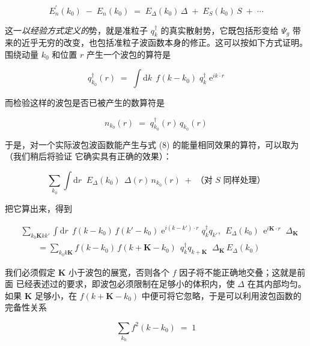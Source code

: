 \begin{equation*}
E^{\prime}_{n}(k_{0}) \;-\; E_{n}(k_{0}) \;=\; E_{\Delta}(k_{0})\,\Delta \;+\; E_{S}(k_{0})\, S \;+\; \cdots
\tag{8}
\end{equation*}

这一\emph{以经验方式定义的}势，就是准粒子 $q_{k}^{\dagger}$ 的真实散射势，它既包括形变给
$\Psi_{g}$ 带来的近乎无穷的改变，也包括准粒子波函数本身的修正。这可以按如下方式证明。
围绕动量 $k_{0}$ 和位置 $r$ 产生一个波包的算符是

\begin{equation*}
q_{k_{0}}^{\dagger}(r) \;=\; \int \mathrm{d}k\;\, f(k-k_{0})\; q_{k}^{\dagger}\; \mathrm{e}^{ik\cdot r}
\end{equation*}

而检验这样的波包是否已被产生的数算符是

\begin{equation*}
n_{k_{0}}(r) \;=\; q_{k_{0}}^{\dagger}(r)\, q_{k_{0}}(r)
\end{equation*}

于是，对一个实际波包波函数能产生与式 (8) 的能量相同效果的算符，可以取为（我们稍后将验证
它确实具有正确的效果）：

\begin{equation*}
\sum_{k_{0}} \int \mathrm{d}r\;\; E_{\Delta}(k_{0})\;\, \Delta(r)\, n_{k_{0}}(r) \;+\; \text{（对 } S \text{ 同样处理）}
\end{equation*}

把它算出来，得到

\begin{align*}
& \sum_{k_{0}\mathbf{K}kk'} \int \mathrm{d}r\;\, f(k-k_{0})\, f(k'-k_{0})\;
\mathrm{e}^{i(k-k')\cdot r}\; q_{k}^{\dagger} q_{k'},\;\, E_{\Delta}(k_{0})\;\, \mathrm{e}^{i\mathbf{K}\cdot r}\;\; \Delta_{\mathbf{K}} \\
& \qquad = \sum_{k_{0}k\mathbf{K}} f(k-k_{0})\, f(k+\mathbf{K}-k_{0})\;\, q_{k}^{\dagger} q_{k+\mathbf{K}}\;\; \Delta_{\mathbf{K}}\, E_{\Delta}(k_{0})
\end{align*}

我们必须假定 $\mathbf{K}$ 小于波包的展宽，否则各个 $f$ 因子将不能正确地交叠；这就是前面
已经表述过的要求，即波包必须限制在足够小的体积内，使 $\Delta$ 在其内部均匀。如果
$\mathbf{K}$ 足够小，在 $f(k+\mathbf{K}-k_{0})$ 中便可将它忽略，于是可以利用波包函数的
完备性关系

\begin{equation*}
\sum_{k_{0}} f^{2}(k-k_{0}) \;=\; 1
\end{equation*}


